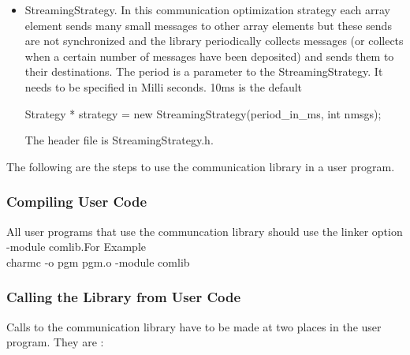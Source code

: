 \begin{itemize}
\item StreamingStrategy. In this communication optimization strategy 
each array element sends many small messages to other array elements
but these sends are not synchronized and the library periodically
collects messages (or collects when a certain number of messages have
been deposited) and sends them to their destinations. The period is a
parameter to the StreamingStrategy. It needs to be specified in Milli
seconds. 10ms is the default

Strategy * strategy = new StreamingStrategy(period\_in\_ms, int nmsgs);

The header file is StreamingStrategy.h.

\end{itemize}

The following are the steps to use the communication library 
in a user program.

\subsubsection{Compiling User Code}

All user programs that use the communcation library should use the
linker option -module comlib.For Example \\ 
charmc -o pgm pgm.o -module comlib

\subsubsection {Calling the Library from User Code}
Calls to the communication library have to be made at two places in
the user program. They are :

